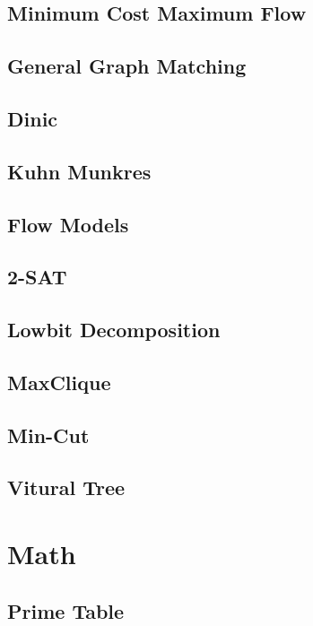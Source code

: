 \documentclass[a4paper,10pt,twocolumn,oneside]{article}
\begin{document}
\subsection{Minimum Cost Maximum Flow}

\subsection{General Graph Matching}

\subsection{Dinic}

\subsection{Kuhn Munkres}

\subsection{Flow Models}

\subsection{2-SAT}

\subsection{Lowbit Decomposition}

\subsection{MaxClique}

\subsection{Min-Cut}

\subsection{Vitural Tree}


\section{Math}
\subsection{Prime Table}

\end{document}
